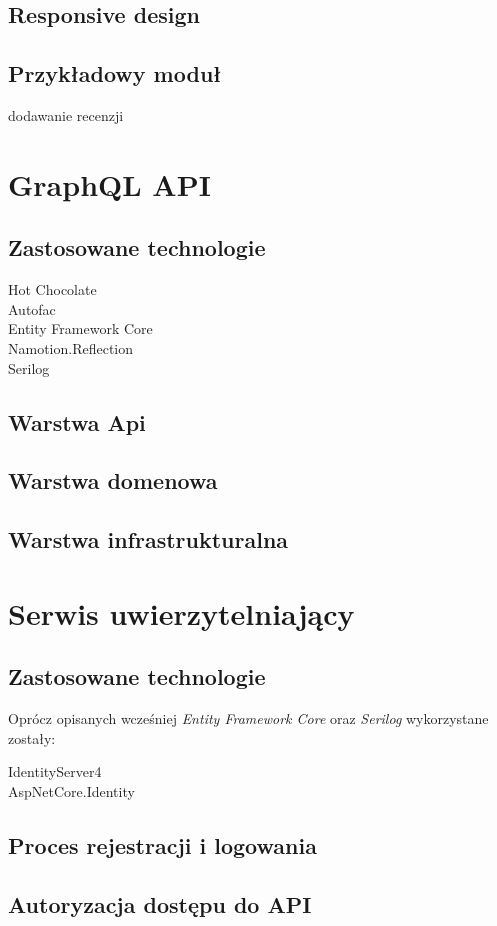 	\subsection{Responsive design}

	\subsection{Przykładowy moduł}
		dodawanie recenzji

\section{GraphQL API}
	\subsection{Zastosowane technologie}
		\begin{description}
			\item[Hot Chocolate] 
			\item[Autofac] 
			\item[Entity Framework Core] 
			\item[Namotion.Reflection] 
			\item[Serilog] 
		\end{description}

	\subsection{Warstwa Api}

	\subsection{Warstwa domenowa}

	\subsection{Warstwa infrastrukturalna}
	
\section{Serwis uwierzytelniający}
	\subsection{Zastosowane technologie}
		Oprócz opisanych wcześniej \emph{Entity Framework Core} oraz \emph{Serilog} wykorzystane zostały:
		\begin{description}
			\item[IdentityServer4] 
			\item[AspNetCore.Identity] 
		\end{description}

	\subsection{Proces rejestracji i logowania}

	\subsection{Autoryzacja dostępu do API}